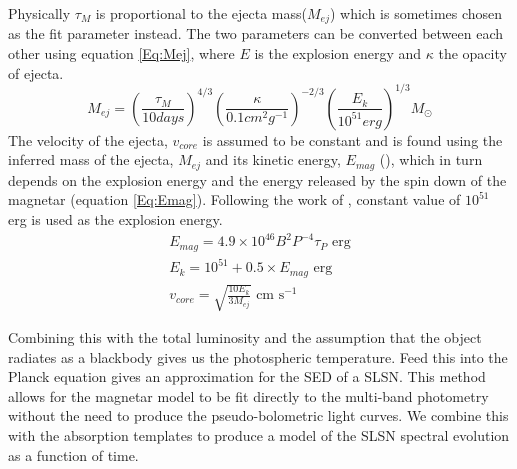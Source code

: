 Physically $\tau_M$ is proportional to the ejecta mass($M_{ej}$) which is sometimes chosen as the fit parameter instead. The two parameters can be converted between each other using equation \ref{Eq:Mej}, where $E$ is the explosion energy and $\kappa$ the opacity of ejecta.
\begin{equation}
\label{Eq:Mej}
M_{ej} = (\frac{\tau_{M}}{10days})^{4/3}(\frac{\kappa}{0.1cm^2g^{-1}})^{-2/3}(\frac{E_k}{10^{51}erg})^{1/3}M_{\odot}
\end{equation}
\noindent The velocity of the ejecta, $v_{core}$ is assumed to be constant and is found using the inferred mass of the ejecta, $M_{ej}$ and its kinetic energy, $E_{mag}$ (), which in turn depends on the explosion energy and the energy released by the spin down of the magnetar (equation \ref{Eq:Emag}). Following the work of \cite{2013ApJ...770..128I,2013Natur.502..346N,2015MNRAS.452.3869N}, constant value of $10^{51}$ erg is used as the explosion energy.
\begin{align}
\label{Eq:Emag}
E_{mag} = 4.9\times10^{46} B^2 P^{-4} \tau_{P}  \text{ erg} \\
E_k = 10^{51} + 0.5 \times E_{mag} \text{ erg}\\
\label{Eq:vcore}
v_{core} =  \sqrt{\frac{10 E_{k}}{3 M_{ej}}} \text{ cm s}^{-1}
\end{align}



Combining this with the total luminosity and the assumption that the object radiates as a blackbody gives us the photospheric temperature. Feed this into the Planck equation gives an approximation for the SED of a SLSN. This method allows for the magnetar model to be fit directly to the multi-band photometry without the need to produce the pseudo-bolometric light curves. We combine this with the absorption templates to produce a model of the SLSN spectral evolution as a function of time.

